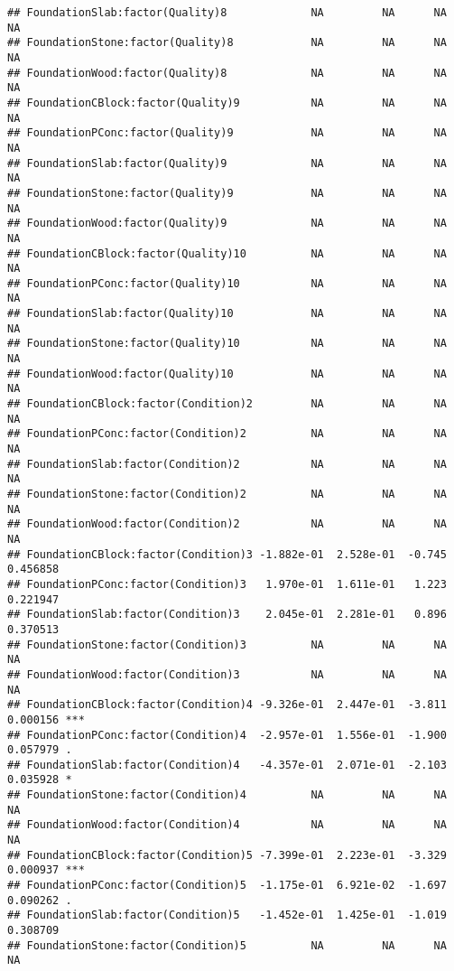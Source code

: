 \documentclass[
]{article}
\begin{document}
\begin{verbatim}
## FoundationSlab:factor(Quality)8             NA         NA      NA       NA    
## FoundationStone:factor(Quality)8            NA         NA      NA       NA    
## FoundationWood:factor(Quality)8             NA         NA      NA       NA    
## FoundationCBlock:factor(Quality)9           NA         NA      NA       NA    
## FoundationPConc:factor(Quality)9            NA         NA      NA       NA    
## FoundationSlab:factor(Quality)9             NA         NA      NA       NA    
## FoundationStone:factor(Quality)9            NA         NA      NA       NA    
## FoundationWood:factor(Quality)9             NA         NA      NA       NA    
## FoundationCBlock:factor(Quality)10          NA         NA      NA       NA    
## FoundationPConc:factor(Quality)10           NA         NA      NA       NA    
## FoundationSlab:factor(Quality)10            NA         NA      NA       NA    
## FoundationStone:factor(Quality)10           NA         NA      NA       NA    
## FoundationWood:factor(Quality)10            NA         NA      NA       NA    
## FoundationCBlock:factor(Condition)2         NA         NA      NA       NA    
## FoundationPConc:factor(Condition)2          NA         NA      NA       NA    
## FoundationSlab:factor(Condition)2           NA         NA      NA       NA    
## FoundationStone:factor(Condition)2          NA         NA      NA       NA    
## FoundationWood:factor(Condition)2           NA         NA      NA       NA    
## FoundationCBlock:factor(Condition)3 -1.882e-01  2.528e-01  -0.745 0.456858    
## FoundationPConc:factor(Condition)3   1.970e-01  1.611e-01   1.223 0.221947    
## FoundationSlab:factor(Condition)3    2.045e-01  2.281e-01   0.896 0.370513    
## FoundationStone:factor(Condition)3          NA         NA      NA       NA    
## FoundationWood:factor(Condition)3           NA         NA      NA       NA    
## FoundationCBlock:factor(Condition)4 -9.326e-01  2.447e-01  -3.811 0.000156 ***
## FoundationPConc:factor(Condition)4  -2.957e-01  1.556e-01  -1.900 0.057979 .  
## FoundationSlab:factor(Condition)4   -4.357e-01  2.071e-01  -2.103 0.035928 *  
## FoundationStone:factor(Condition)4          NA         NA      NA       NA    
## FoundationWood:factor(Condition)4           NA         NA      NA       NA    
## FoundationCBlock:factor(Condition)5 -7.399e-01  2.223e-01  -3.329 0.000937 ***
## FoundationPConc:factor(Condition)5  -1.175e-01  6.921e-02  -1.697 0.090262 .  
## FoundationSlab:factor(Condition)5   -1.452e-01  1.425e-01  -1.019 0.308709    
## FoundationStone:factor(Condition)5          NA         NA      NA       NA    

\end{verbatim}
\end{document}
